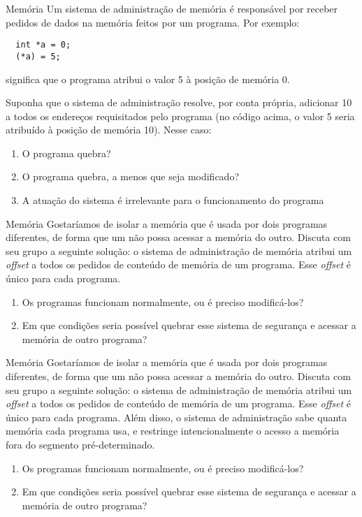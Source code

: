 \documentclass{beamer}
\begin{document}
\begin{frame}[fragile]{Memória}
  \centering
  \large
  Um sistema de administração de memória é responsável por receber pedidos de
  dados na memória feitos por um programa. Por exemplo:
  \begin{verbatim}
  int *a = 0;
  (*a) = 5;
  \end{verbatim}
  significa que o programa atribui o valor 5 à posição de memória 0.

  Suponha que o sistema de administração resolve, por conta própria, adicionar
  10 a todos os endereços requisitados pelo programa (no código acima, o valor 5
  seria atribuído à posição de memória 10). Nesse caso:
  \begin{enumerate}
    \item O programa quebra?
    \item O programa quebra, a menos que seja modificado?
    \item A atuação do sistema é irrelevante para o funcionamento do programa
  \end{enumerate}
\end{frame}

\begin{frame}[fragile]{Memória}
  \centering
  \large
  Gostaríamos de isolar a memória que é usada por dois programas diferentes, de
  forma que um não possa acessar a memória do outro. Discuta com seu grupo a
  seguinte solução: o sistema de administração de memória atribui um
  \textit{offset} a todos os pedidos de conteúdo de memória de um programa. Esse
  \textit{offset} é único para cada programa.
  \begin{enumerate}
    \item Os programas funcionam normalmente, ou é preciso modificá-los?
    \item Em que condições seria possível quebrar esse sistema de segurança e
      acessar a memória de outro programa?
  \end{enumerate}
\end{frame}

\begin{frame}[fragile]{Memória}
  \centering
  \large
  Gostaríamos de isolar a memória que é usada por dois programas diferentes, de
  forma que um não possa acessar a memória do outro. Discuta com seu grupo a
  seguinte solução: o sistema de administração de memória atribui um
  \textit{offset} a todos os pedidos de conteúdo de memória de um programa. Esse
  \textit{offset} é único para cada programa. Além disso, o sistema de
  administração sabe quanta memória cada programa usa, e restringe
  intencionalmente o acesso a memória fora do segmento pré-determinado.
  \begin{enumerate}
    \item Os programas funcionam normalmente, ou é preciso modificá-los?
    \item Em que condições seria possível quebrar esse sistema de segurança e
      acessar a memória de outro programa?
  \end{enumerate}
\end{frame}
\end{document}
